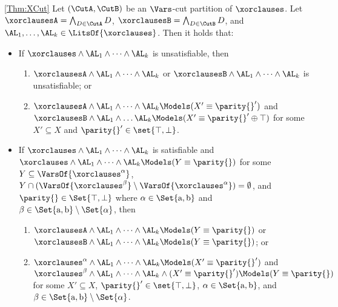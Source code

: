 \begin{retheorem}{\ref{Thm:XCut}}
Let $ (\CutA, \CutB) $ be an $\Vars$-cut partition of $\xorclauses$.
Let $ \xorclausesA = \bigwedge_{D \in \CutA} D$, $\xorclausesB = \bigwedge_{D \in \CutB} D$, and $\AL_1,\dots,\AL_k \in \LitsOf{\xorclauses}$.
 Then
it holds that:
\begin{itemize}
\item If $\xorclauses \wedge \AL_1 \wedge \dots \wedge \AL_k $ is unsatisfiable, then
\begin{enumerate}
\item $ \xorclausesA \wedge \AL_1 \wedge \dots \wedge \AL_k $ 
or $ \xorclausesB \wedge \AL_1 \wedge \dots \wedge \AL_k $ is unsatisfiable; or 
\item $\xorclausesA \wedge \AL_1 \wedge \dots \wedge \AL_k \Models 
(X' \equiv \parity{}')$ and $ \xorclausesB \wedge \AL_1 \wedge \dots
\AL_k \Models (X' \equiv \parity{}' \oplus \top) $ for some $ X' \subseteq X $
and $ \parity{}' \in \set{\top, \bot} $.
\end{enumerate}
\item 
If $\xorclauses \wedge \AL_1 \wedge \dots \wedge \AL_k $ is satisfiable
and $ \xorclauses \wedge \AL_1 \wedge \dots \wedge \AL_k \Models (Y \equiv \parity{}) $ for some $Y \subseteq \VarsOf{\xorclauses^\alpha}$, $Y \cap (\VarsOf{\xorclauses^\beta} \setminus \VarsOf{\xorclauses^\alpha}) = \emptyset$, and $\parity{} \in \Set{\top, \bot}$ where $\alpha \in \Set{\textup{a},\textup{b}}$ and $ \beta \in \Set{\textup{a}, \textup{b}} \setminus \Set{\alpha} $, then
\begin{enumerate}
\item $\xorclausesA \wedge \AL_1 \wedge \dots \wedge \AL_k \Models (Y \equiv \parity{}) $
or $ \xorclausesB \wedge \AL_1 \wedge \dots \wedge \AL_k \Models (Y \equiv \parity{}) $;
or
\item $\xorclauses^\alpha \wedge \AL_1 \wedge \dots \wedge \AL_k \Models 
( X' \equiv \parity{}') $ and $ \xorclauses^\beta \wedge \AL_1 \wedge \dots \wedge \AL_k \wedge (X' \equiv \parity{}') \Models (Y \equiv \parity{}) $ for some $X' \subseteq X$,
$\parity{}' \in \set{\top,\bot}$, $\alpha \in \Set{\textup{a},\textup{b}}$, and $\beta \in \Set{\textup{a},\textup{b}}\setminus\Set{\alpha}$.
\end{enumerate}
\end{itemize}
\end{retheorem}
